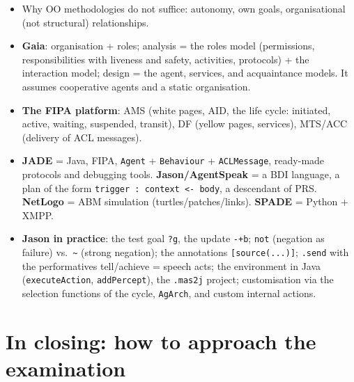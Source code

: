 \documentclass[11pt,a4paper]{article}
\theoremstyle{definition}
\begin{document}
\begin{itemize}
\item Why OO methodologies do not suffice: autonomy, own goals, organisational (not structural)
  relationships.
\item \textbf{Gaia}: organisation + roles; analysis = the roles model (permissions,
  responsibilities with liveness and safety, activities, protocols) + the interaction model;
  design = the agent, services, and acquaintance models. It assumes cooperative agents and a
  static organisation.
\item \textbf{The FIPA platform}: AMS (white pages, AID, the life cycle: initiated, active,
  waiting, suspended, transit), DF (yellow pages, services), MTS/ACC (delivery of ACL
  messages).
\item \textbf{JADE} = Java, FIPA, \texttt{Agent} + \texttt{Behaviour} + \texttt{ACLMessage},
  ready-made protocols and debugging tools. \textbf{Jason/AgentSpeak} = a BDI language, a plan
  of the form \texttt{trigger : context <- body}, a descendant of PRS. \textbf{NetLogo} = ABM
  simulation (turtles/patches/links). \textbf{SPADE} = Python + XMPP.
\item \textbf{Jason in practice}: the test goal \texttt{?g}, the update \texttt{-+b};
  \texttt{not} (negation as failure) vs.\ \texttt{\textasciitilde} (strong negation); the
  annotations \texttt{[source(...)]}; \texttt{.send} with the performatives tell/achieve =
  speech acts; the environment in Java (\texttt{executeAction}, \texttt{addPercept}), the
  \texttt{.mas2j} project; customisation via the selection functions of the cycle,
  \texttt{AgArch}, and custom internal actions.
\end{itemize}

\section*{In closing: how to approach the examination}
\end{document}
